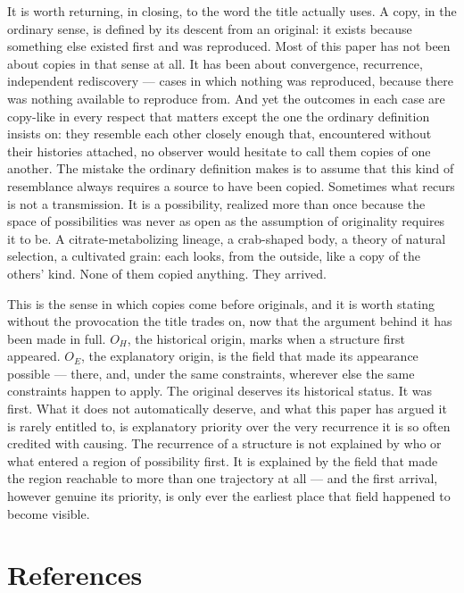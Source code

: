 \documentclass[11pt]{article}
\theoremstyle{plain}
\begin{document}
It is worth returning, in closing, to the word the title actually uses. A copy, in the ordinary sense, is defined by its descent from an original: it exists because something else existed first and was reproduced. Most of this paper has not been about copies in that sense at all. It has been about convergence, recurrence, independent rediscovery --- cases in which nothing was reproduced, because there was nothing available to reproduce from. And yet the outcomes in each case are copy-like in every respect that matters except the one the ordinary definition insists on: they resemble each other closely enough that, encountered without their histories attached, no observer would hesitate to call them copies of one another. The mistake the ordinary definition makes is to assume that this kind of resemblance always requires a source to have been copied. Sometimes what recurs is not a transmission. It is a possibility, realized more than once because the space of possibilities was never as open as the assumption of originality requires it to be. A citrate-metabolizing lineage, a crab-shaped body, a theory of natural selection, a cultivated grain: each looks, from the outside, like a copy of the others' kind. None of them copied anything. They arrived.

This is the sense in which copies come before originals, and it is worth stating without the provocation the title trades on, now that the argument behind it has been made in full. \(O_H\), the historical origin, marks when a structure first appeared. \(O_E\), the explanatory origin, is the field that made its appearance possible --- there, and, under the same constraints, wherever else the same constraints happen to apply. The original deserves its historical status. It was first. What it does not automatically deserve, and what this paper has argued it is rarely entitled to, is explanatory priority over the very recurrence it is so often credited with causing. The recurrence of a structure is not explained by who or what entered a region of possibility first. It is explained by the field that made the region reachable to more than one trajectory at all --- and the first arrival, however genuine its priority, is only ever the earliest place that field happened to become visible.


\newpage
\section*{References}
\end{document}
